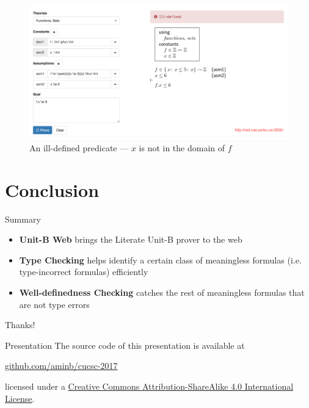 \documentclass[10pt]{beamer}
\newcommand{\unitb}{Unit-B\xspace}
\begin{document}
\begin{frame}[plain]
  \begin{figure}
    \centering
    \includegraphics[width=\textwidth]{img/unitb_wd.png}
    \caption{An ill-defined predicate --- $x$ is not in
                  the domain of $f$}\label{fig:wd}
  \end{figure}
\end{frame}


\section{Conclusion}

\begin{frame}{Summary}

  \begin{itemize}[<+->]
  \item \textbf{\unitb Web} brings the Literate Unit-B prover to the web
  \item \textbf{Type Checking} helps identify a certain class of
    meaningless formulas (i.e. type-incorrect formulas) efficiently
  \item \textbf{Well-definedness Checking} catches the rest of
    meaningless formulas that are not type errors
  \end{itemize}

\end{frame}

\begin{frame}[standout]
  Thanks!
\end{frame}

\appendix

\begin{frame}[fragile]{Presentation}
  The source code of this presentation is available at

  \begin{center}
    \href{https://github.com/aminb/cucsc-2017}{\url{github.com/aminb/cucsc-2017}}
  \end{center}

  licensed under a
  \href{http://creativecommons.org/licenses/by-sa/4.0/}{Creative Commons
  Attribution-ShareAlike 4.0 International License}.

  \begin{center}\ccbysa\end{center}
\end{frame}
\end{document}
